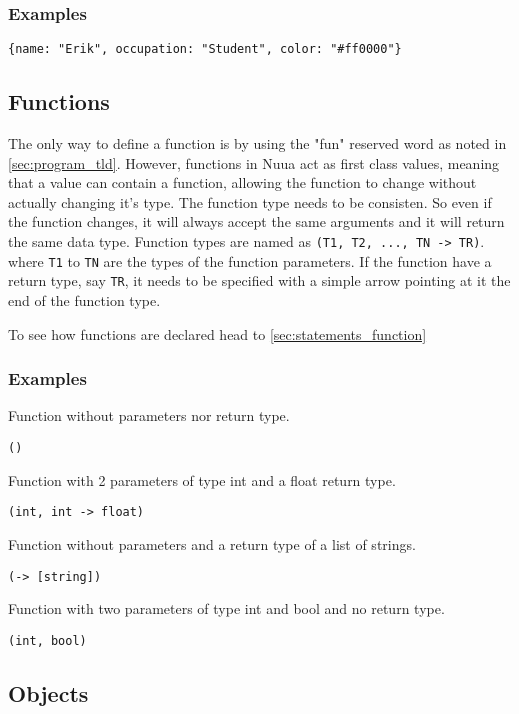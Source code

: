 \subsubsection{Examples}

\begin{lstlisting}
{name: "Erik", occupation: "Student", color: "#ff0000"}
\end{lstlisting}

\subsection{Functions}

The only way to define a function is by using the "fun" reserved word as noted in \autoref{sec:program_tld}. However, functions in Nuua
act as first class values, meaning that a value can contain a function, allowing the function to change without actually changing it's type.
The function type needs to be consisten. So even if the function changes, it will always accept the same arguments and it will return the same data type.
Function types are named as \texttt{(T1, T2, ..., TN -> TR)}. where \texttt{T1} to \texttt{TN} are the types of the function parameters.
If the function have a return type, say \texttt{TR}, it needs to be specified with a simple arrow pointing at it the end of the function type.

To see how functions are declared head to \autoref{sec:statements_function}

\subsubsection{Examples}

Function without parameters nor return type.
\begin{lstlisting}
()
\end{lstlisting}
Function with 2 parameters of type int and a float return type.
\begin{lstlisting}
(int, int -> float)
\end{lstlisting}
Function without parameters and a return type of a list of strings.
\begin{lstlisting}
(-> [string])
\end{lstlisting}
Function with two parameters of type int and bool and no return type.
\begin{lstlisting}
(int, bool)
\end{lstlisting}

\subsection{Objects}

